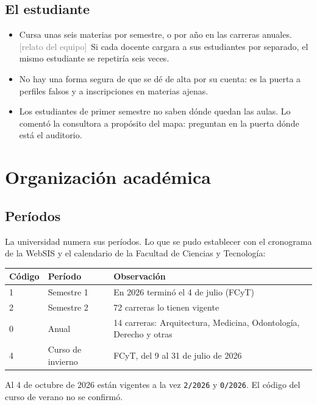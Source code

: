 \documentclass[11pt,letterpaper]{article}
\newcommand{\relatado}{\textcolor{gray}{\footnotesize\,[relato del equipo]}}
\begin{document}
\subsection{El estudiante}

\begin{itemize}
  \item Cursa unas seis materias por semestre, o por año en las carreras anuales.
        \relatado\ Si cada docente cargara a sus estudiantes por separado, el mismo
        estudiante se repetiría seis veces.
  \item No hay una forma segura de que se dé de alta por su cuenta: es la puerta a
        perfiles falsos y a inscripciones en materias ajenas.
  \item Los estudiantes de primer semestre no saben dónde quedan las aulas. Lo comentó la
        consultora a propósito del mapa: preguntan en la puerta dónde está el auditorio.
\end{itemize}

\section{Organización académica}

\subsection{Períodos}

La universidad numera sus períodos. Lo que se pudo establecer con el cronograma de la
WebSIS y el calendario de la Facultad de Ciencias y Tecnología:

\begin{center}
\begin{tabular}{@{}C{1.6cm}L{4.4cm}L{9.8cm}@{}}
\hline
\textbf{Código} & \textbf{Período} & \textbf{Observación} \\
 & Semestre 1 & En 2026 terminó el 4 de julio (FCyT) \\
2 & Semestre 2 & 72 carreras lo tienen vigente \\
0 & Anual & 14 carreras: Arquitectura, Medicina, Odontología, Derecho y otras \\
4 & Curso de invierno & FCyT, del 9 al 31 de julio de 2026 \\
\hline
\end{tabular}
\end{center}

Al 4 de octubre de 2026 están vigentes a la vez \texttt{2/2026} y \texttt{0/2026}. El
código del curso de verano no se confirmó.
\end{document}
